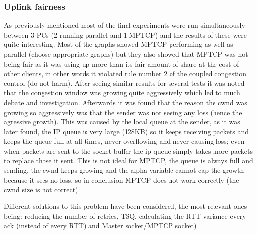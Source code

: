 \subsubsection{Uplink fairness}
As previously mentioned most of the final experiments were run simultaneously
between 3 PCs (2 running parallel and 1 MPTCP) and the results of these were
quite interesting. Most of the graphs showed MPTCP performing as well as
parallel (choose appropriate graphs) but they also showed that MPTCP was not
being fair as it was using up more than its fair amount of share at the cost of
other clients, in other words it violated rule number 2 of the coupled
congestion control (do not harm). After seeing similar results for several tests
it was noted that the congestion window was growing quite aggressively which led
to much debate and investigation. Afterwards it was found that the reason the
cwnd was growing so aggressively was that the sender was not seeing any loss
(hence the agressive growth). This was caused by the local queue at the sender,
as it was later found, the IP queue is very large (128KB) so it keeps receiving
packets and keeps the queue full at all times, never overflowing and never
causing loss; even when packets are sent to the socket buffer the ip queue
simply takes more packets to replace those it sent. This is not ideal for MPTCP,
the queue is always full and sending, the cwnd keeps growing and the alpha
variable cannot cap the growth because it sees no loss, so in conclusion MPTCP
does not work correctly (the cwnd size is not correct).

Different solutions to this problem have been considered, the most relevant ones
being: reducing the number of retries, TSQ, calculating the RTT variance every
ack (instead of every RTT) and Master socket/MPTCP socket)
